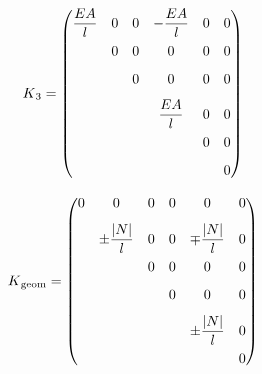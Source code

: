 \begin{equation} \label{K3}
K\textsubscript{3} = \begin{pmatrix}
\dfrac{EA}{l} & 0                   & 0                   & -\dfrac{EA}{l}  & 0                   & 0                   \\[0.8em]
              & 0                   & 0                   & 0               & 0                   & 0                   \\[0.8em]
              &                     & 0                   & 0               & 0                   & 0                   \\[0.8em]
              &                     &                     & \dfrac{EA}{l}   & 0                   & 0                   \\[0.8em]
              &                     &                     &                 & 0                   & 0                   \\[0.8em]
              &                     &                     &                 &                     & 0
     \end{pmatrix}
\end{equation}

\begin{equation} \label{Kgeom}
K\textsubscript{geom} = \begin{pmatrix}
            0 & 0                            & 0                   & 0               & 0                            & 0                   \\[0.8em]
              & \pm\dfrac{\lvert N\lvert}{l} & 0                   & 0               & \mp\dfrac{\lvert N\lvert}{l} & 0                   \\[0.8em]
              &                              & 0                   & 0               & 0                            & 0                   \\[0.8em]
              &                              &                     & 0               & 0                            & 0                   \\[0.8em]
              &                              &                     &                 & \pm\dfrac{\lvert N\lvert}{l} & 0                   \\[0.8em]
              &                              &                     &                 &                              & 0
     \end{pmatrix}
\end{equation}


